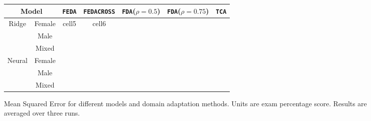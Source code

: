\documentclass{article}
\begin{document}
\begin{figure}[h]
\label{baselines}
\centering{}
\begin{center}
\begin{tabular}{ |c|c||c|c|c|c|c| }
 \hline
 \multicolumn{2}{|c|}{Model} & \texttt{FEDA} & \texttt{FEDACROSS} & \texttt{FDA}(\(\rho=0.5\)) & \texttt{FDA}(\(\rho=0.75\)) & \texttt{TCA} \\ 
 \hline
 \hline
 \multirow{3}{*}{Ridge} & Female & cell5 & cell6 & & & \\  
 \cline{2-7}
       & Male                    &          & & & & \\
 \cline{2-7}
       & Mixed                    &          & & & & \\
 \hline
 \multirow{3}{*}{Neural} & Female & & & & & \\
 \cline{2-7}
       & Male & & & & & \\
 \cline{2-7}
       & Mixed & & & & & \\
 \hline
\end{tabular}
\end{center}
\caption{Mean Squared Error for different models and domain adaptation methods. Units are exam percentage score. Results are averaged over three runs.}
\end{figure}

\medskip

\small



\end{document}
